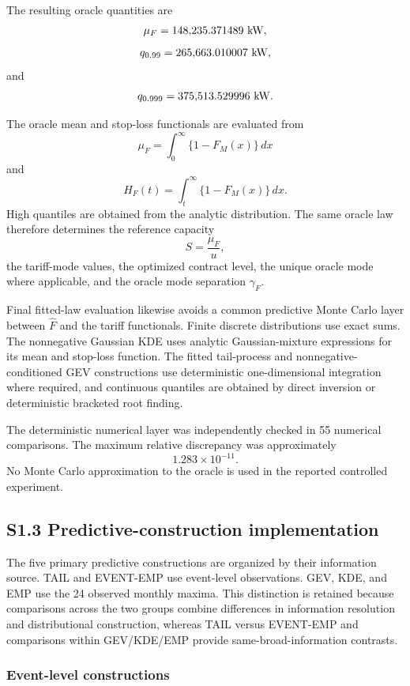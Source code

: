 \documentclass[AMA,Times1COL]{WileyNJDv5}
\begin{document}
The resulting oracle quantities are
\[
\mu_F
=
148{,}235.371489\ {\rm kW},
\]
\[
q_{0.99}
=
265{,}663.010007\ {\rm kW},
\]
and
\[
q_{0.999}
=
375{,}513.529996\ {\rm kW}.
\]

The oracle mean and stop-loss functionals are evaluated from
\[
\mu_F
=
\int_0^\infty
\{1-F_M(x)\}\,dx
\]
and
\[
H_F(t)
=
\int_t^\infty
\{1-F_M(x)\}\,dx.
\]
High quantiles are obtained from the analytic distribution. The same
oracle law therefore determines the reference capacity
\[
S=\frac{\mu_F}{u},
\]
the tariff-mode values, the optimized contract level, the unique
oracle mode where applicable, and the oracle mode separation
\(\gamma_F\).

Final fitted-law evaluation likewise avoids a common predictive
Monte Carlo layer between \(\widehat F\) and the tariff functionals.
Finite discrete distributions use exact sums. The nonnegative
Gaussian KDE uses analytic Gaussian-mixture expressions for its mean
and stop-loss function. The fitted tail-process and
nonnegative-conditioned GEV constructions use deterministic
one-dimensional integration where required, and continuous quantiles
are obtained by direct inversion or deterministic bracketed root
finding.

The deterministic numerical layer was independently checked in
55 numerical comparisons. The maximum relative discrepancy was
approximately
\[
1.283\times10^{-11}.
\]
No Monte Carlo approximation to the oracle is used in the reported
controlled experiment.



\subsection*{S1.3 Predictive-construction implementation}

The five primary predictive constructions are organized by their
information source. TAIL and EVENT-EMP use event-level observations.
GEV, KDE, and EMP use the 24 observed monthly maxima. This distinction
is retained because comparisons across the two groups combine
differences in information resolution and distributional construction,
whereas TAIL versus EVENT-EMP and comparisons within
GEV/KDE/EMP provide same-broad-information contrasts.


\subsubsection*{Event-level constructions}
\end{document}
